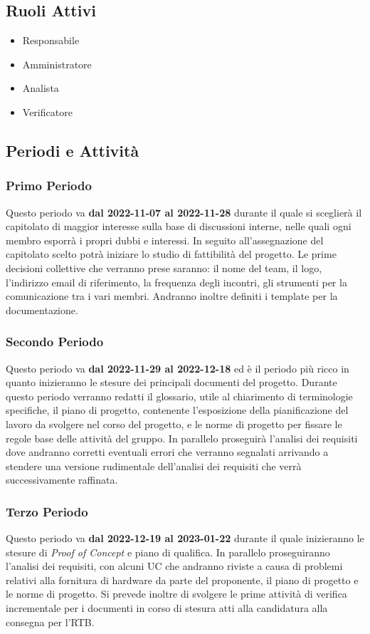 \subsection{Ruoli Attivi}
\begin{itemize}
    \item Responsabile
    \item Amministratore
    \item Analista
    \item Verificatore
\end{itemize}

\subsection{Periodi e Attività}

\subsubsection{Primo Periodo}
Questo periodo va \textbf{dal 2022-11-07 al 2022-11-28} durante il quale si sceglierà il capitolato di maggior interesse sulla base di discussioni interne, nelle quali ogni membro esporrà i propri dubbi e interessi. In seguito all'assegnazione del capitolato scelto potrà iniziare lo studio di fattibilità del progetto. 
Le prime decisioni collettive che verranno prese saranno: il nome del team, il logo, l’indirizzo email di riferimento, la frequenza degli incontri, gli strumenti per la comunicazione tra i vari membri.
Andranno inoltre definiti i template per la documentazione.

\subsubsection{Secondo Periodo}
Questo periodo va \textbf{dal 2022-11-29 al 2022-12-18} ed è il periodo più ricco in quanto inizieranno le stesure dei principali documenti del progetto. Durante questo periodo verranno redatti il glossario, utile al chiarimento di terminologie specifiche, il piano di progetto, contenente l’esposizione della pianificazione del lavoro da svolgere nel corso del progetto, e le norme di progetto per fissare le regole base delle attività del gruppo. 
In parallelo proseguirà l'analisi dei requisiti dove andranno corretti eventuali errori che verranno segnalati arrivando a stendere una versione rudimentale dell'analisi dei requisiti che verrà successivamente raffinata.

\subsubsection{Terzo Periodo}
Questo periodo va \textbf{dal 2022-12-19 al 2023-01-22} durante il quale inizieranno le stesure di {\it{Proof of Concept}} e piano di qualifica. In parallelo proseguiranno l'analisi dei requisiti, con alcuni UC che andranno riviste a causa di problemi relativi alla fornitura di hardware da parte del proponente, il piano di progetto e le norme di progetto.
Si prevede inoltre di svolgere le prime attività di verifica incrementale per i documenti in corso di stesura atti alla candidatura alla consegna per l'RTB.

